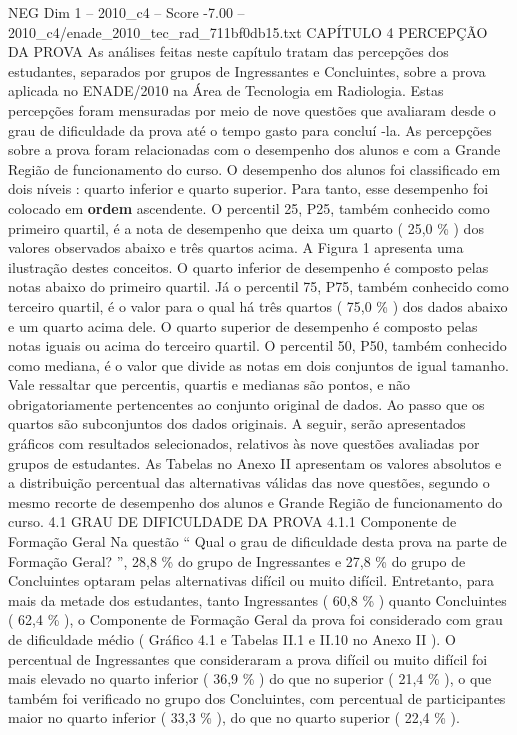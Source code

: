 \begin{textsample}{NEG Dim 1 – 2010\_c4 – Score -7.00 – 2010\_c4/enade\_2010\_tec\_rad\_711bf0db15.txt}  \label{ex:f1_neg_034}
CAPÍTULO 4 PERCEPÇÃO DA PROVA As análises feitas neste capítulo tratam das percepções dos estudantes, separados por grupos de Ingressantes e Concluintes, sobre a prova aplicada no ENADE/2010 na Área de Tecnologia em Radiologia.
Estas percepções foram mensuradas por meio de nove questões que avaliaram desde o grau de dificuldade da prova até o tempo gasto para concluí -la.
As percepções sobre a prova foram relacionadas com o desempenho dos alunos e com a Grande Região de funcionamento do curso.
O desempenho dos alunos foi classificado em dois níveis : quarto inferior e quarto superior.
Para tanto, esse desempenho foi colocado em \textbf{ordem} ascendente.
O percentil 25, P25, também conhecido como primeiro quartil, é a nota de desempenho que deixa um quarto ( 25,0 \% ) dos valores observados abaixo e três quartos acima.
A Figura 1 apresenta uma ilustração destes conceitos.
O quarto inferior de desempenho é composto pelas notas abaixo do primeiro quartil.
Já o percentil 75, P75, também conhecido como terceiro quartil, é o valor para o qual há três quartos ( 75,0 \% ) dos dados abaixo e um quarto acima dele.
O quarto superior de desempenho é composto pelas notas iguais ou acima do terceiro quartil.
O percentil 50, P50, também conhecido como mediana, é o valor que divide as notas em dois conjuntos de igual tamanho.
Vale ressaltar que percentis, quartis e medianas são pontos, e não obrigatoriamente pertencentes ao conjunto original de dados.
Ao passo que os quartos são subconjuntos dos dados originais.
A seguir, serão apresentados gráficos com resultados selecionados, relativos às nove questões avaliadas por grupos de estudantes.
As Tabelas no Anexo II apresentam os valores absolutos e a distribuição percentual das alternativas válidas das nove questões, segundo o mesmo recorte de desempenho dos alunos e Grande Região de funcionamento do curso. 4.1 GRAU DE DIFICULDADE DA PROVA 4.1.1 Componente de Formação Geral Na questão “ Qual o grau de dificuldade desta prova na parte de Formação Geral? ”, 28,8 \% do grupo de Ingressantes e 27,8 \% do grupo de Concluintes optaram pelas alternativas difícil ou muito difícil.
Entretanto, para mais da metade dos estudantes, tanto Ingressantes ( 60,8 \% ) quanto Concluintes ( 62,4 \% ), o Componente de Formação Geral da prova foi considerado com grau de dificuldade médio ( Gráfico 4.1 e Tabelas II.1 e II.10 no Anexo II ).
O percentual de Ingressantes que consideraram a prova difícil ou muito difícil foi mais elevado no quarto inferior ( 36,9 \% ) do que no superior ( 21,4 \% ), o que também foi verificado no grupo dos Concluintes, com percentual de participantes maior no quarto inferior ( 33,3 \% ), do que no quarto superior ( 22,4 \% ).

\end{textsample}

